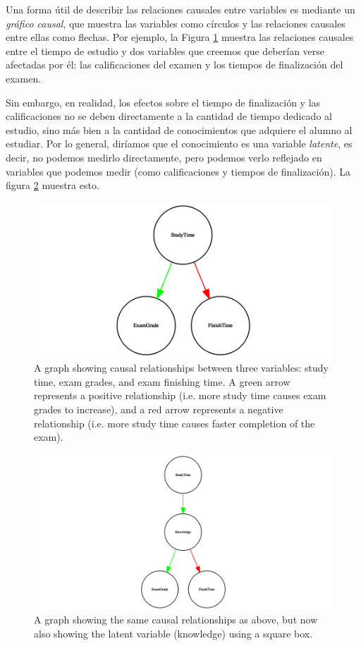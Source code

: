 \documentclass[
  12pt,
]{book}
\theoremstyle{definition}
\theoremstyle{definition}
\theoremstyle{definition}
\theoremstyle{remark}
\begin{document}
Una forma útil de describir las relaciones causales entre variables es mediante un \emph{gráfico causal}, que muestra las variables como círculos y las relaciones causales entre ellas como flechas. Por ejemplo, la Figura \ref{fig:simpleCausalGraph} muestra las relaciones causales entre el tiempo de estudio y dos variables que creemos que deberían verse afectadas por él: las calificaciones del examen y los tiempos de finalización del examen.

Sin embargo, en realidad, los efectos sobre el tiempo de finalización y las calificaciones no se deben directamente a la cantidad de tiempo dedicado al estudio, sino más bien a la cantidad de conocimientos que adquiere el alumno al estudiar. Por lo general, diríamos que el conocimiento es una variable \emph{latente}, es decir, no podemos medirlo directamente, pero podemos verlo reflejado en variables que podemos medir (como calificaciones y tiempos de finalización). La figura \ref{fig:latentCausalGraph} muestra esto.

\begin{figure}
\includegraphics[width=13.33in,height=0.5\textheight]{images/dag_example} \caption{A graph showing causal relationships between three variables: study time, exam grades, and exam finishing time.  A green arrow represents a positive relationship (i.e. more study time causes exam grades to increase), and a red arrow represents a negative relationship (i.e. more study time causes faster completion of the exam).}\label{fig:simpleCausalGraph}
\end{figure}

\begin{figure}
\includegraphics[width=13.33in,height=0.5\textheight]{images/dag_latent_example} \caption{A graph showing the same causal relationships as above, but now also showing the latent variable (knowledge) using a square box.}\label{fig:latentCausalGraph}
\end{figure}
\end{document}
